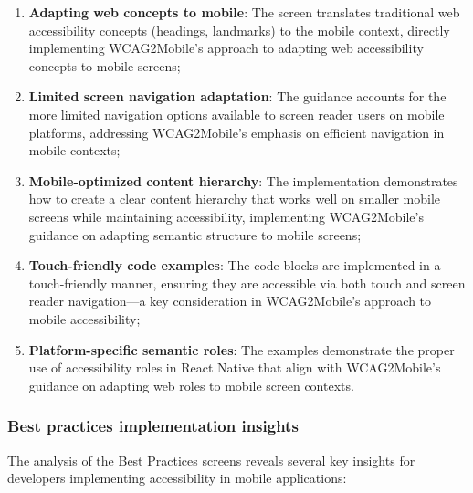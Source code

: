 \begin{enumerate}
    \item \textbf{Adapting web concepts to mobile}: The screen translates traditional web accessibility concepts (headings, landmarks) to the mobile context, directly implementing WCAG2Mobile's approach to adapting web accessibility concepts to mobile screens;
    
    \item \textbf{Limited screen navigation adaptation}: The guidance accounts for the more limited navigation options available to screen reader users on mobile platforms, addressing WCAG2Mobile's emphasis on efficient navigation in mobile contexts;
    
    \item \textbf{Mobile-optimized content hierarchy}: The implementation demonstrates how to create a clear content hierarchy that works well on smaller mobile screens while maintaining accessibility, implementing WCAG2Mobile's guidance on adapting semantic structure to mobile screens;
    
    \item \textbf{Touch-friendly code examples}: The code blocks are implemented in a touch-friendly manner, ensuring they are accessible via both touch and screen reader navigation—a key consideration in WCAG2Mobile's approach to mobile accessibility;
    
    \item \textbf{Platform-specific semantic roles}: The examples demonstrate the proper use of accessibility roles in React Native that align with WCAG2Mobile's guidance on adapting web roles to mobile screen contexts.
\end{enumerate}

\subsubsection{Best practices implementation insights}
\label{subsubsec:best-practices-insights}

The analysis of the Best Practices screens reveals several key insights for developers implementing accessibility in mobile applications:

